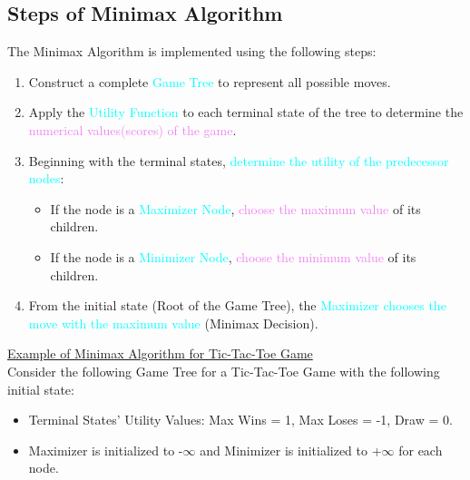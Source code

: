 \documentclass{book}
\begin{document}
\subsection{Steps of Minimax Algorithm}
The Minimax Algorithm is implemented using the following steps:
\begin{enumerate}
    \item Construct a complete \textcolor{cyan}{Game Tree} to represent all possible moves.
    \item Apply the \textcolor{cyan}{Utility Function} to each terminal state of the tree to determine the \textcolor{violet}{numerical values(scores) of the game}.
    \item Beginning with the terminal states, \textcolor{cyan}{determine the utility of the predecessor nodes}:
    \begin{itemize}
        \item If the node is a \textcolor{cyan}{Maximizer Node}, \textcolor{violet}{choose the maximum value} of its children.
        \item If the node is a \textcolor{cyan}{Minimizer Node}, \textcolor{violet}{choose the minimum value} of its children.
    \end{itemize}
    \item From the initial state (Root of the Game Tree), the \textcolor{cyan}{Maximizer chooses the move with the maximum value} (Minimax Decision).\\
\end{enumerate}
\uline{Example of Minimax Algorithm for Tic-Tac-Toe Game}\\
Consider the following Game Tree for a Tic-Tac-Toe Game with the following initial state:
\begin{itemize}
    \item Terminal States' Utility Values: Max Wins = 1, Max Loses = -1, Draw = 0.
    \item Maximizer is initialized to -$\infty$ and Minimizer is initialized to +$\infty$ for each node.
\end{itemize}
\end{document}
